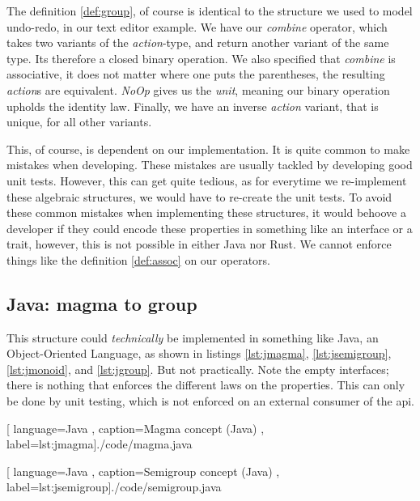 The definition \ref{def:group}, of course is identical to the structure we used
to model undo-redo, in our text editor example. We have our \textit{combine}
operator, which takes two variants of the \textit{action}-type, and return
another variant of the same type. Its therefore a closed binary operation. We
also specified that \textit{combine} is associative, it does not matter where one
puts the parentheses, the resulting \textit{action}s are equivalent.
\textit{NoOp} gives us the \textit{unit}, meaning our binary operation upholds
the identity law. Finally, we have an inverse \textit{action} variant, that is
unique, for all other variants.

This, of course, is dependent on our implementation. It is quite common to make
mistakes when developing. These mistakes are usually tackled by developing good
unit tests. However, this can get quite tedious, as for everytime we re-implement
these algebraic structures, we would have to re-create the unit tests. To avoid
these common mistakes when implementing these structures, it would behoove a
developer if they could encode these properties in something like an interface or
a trait, however, this is not possible in either Java nor Rust. We cannot enforce
things like the definition \ref{def:assoc} on our operators.

\subsection{Java: magma to group}

This structure could \textit{technically} be implemented in something like Java,
an Object-Oriented Language, as shown in listings \ref{lst:jmagma},
\ref{lst:jsemigroup}, \ref{lst:jmonoid}, and \ref{lst:jgroup}. But not
practically. Note the empty interfaces; there is nothing that enforces the
different laws on the properties. This can only be done by unit testing, which
is not enforced on an external consumer of the \gls*{api}.

\begin{center}
  
    [ language=Java
    , caption={Magma concept (Java)}
    , label=lst:jmagma]{./code/magma.java}
\end{center}

\begin{center}
  
    [ language=Java
    , caption={Semigroup concept (Java)}
    , label=lst:jsemigroup]{./code/semigroup.java}
\end{center}

